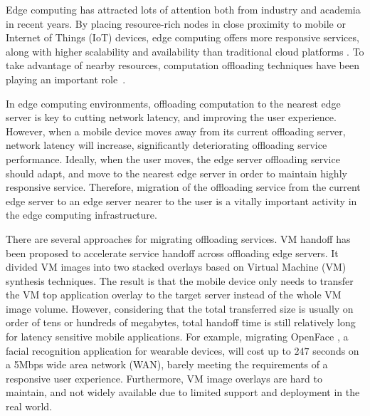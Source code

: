 
Edge computing has attracted lots of attention both from industry and academia in recent years\cite{satya2009case,  MEC2014initiative, MEC2015-5G, yi2015fog,yi2015survey,shi2016edge,chiang2016fog,satya2017edge}.
By placing resource-rich nodes in close proximity to mobile or Internet of Things (IoT) devices, edge computing offers more responsive services, along with higher scalability and availability than traditional cloud platforms \cite{MEC2014initiative,satya2017edge}.
To take advantage of nearby resources, computation offloading techniques have been playing an important role~\cite{cuervo2010maui,lane2016deepx,openface2016,liu2016paradrop}.

In edge computing environments, offloading computation to the nearest edge server is key to cutting network latency, and improving the user experience. 
However, when a mobile device moves away from its current offloading server, network latency will increase, significantly deteriorating offloading service performance. Ideally, when the user moves, the edge server offloading service should adapt, and move to the nearest edge server in order to maintain highly responsive service. 
Therefore, migration of the offloading service from the current edge server to an edge server nearer to the user is a vitally important activity in the edge computing infrastructure. 

There are several approaches for migrating offloading services. 
VM handoff \cite{ha2015vmhandoff} has been proposed to accelerate service handoff across offloading edge servers. It divided VM images into two stacked overlays based on Virtual Machine (VM) synthesis \cite{satya2009case} techniques. 
The result is that the mobile device only needs to transfer the VM top application overlay to the target server instead of the whole VM image volume. However, considering that the total transferred size is usually on order of tens or hundreds of megabytes, total handoff time is still relatively long for latency sensitive mobile applications. For example, migrating OpenFace \cite{openface2016}, a facial recognition application for wearable devices, will cost up to $247$ seconds on a 5Mbps wide area network (WAN), barely meeting the requirements of a responsive user experience. 
Furthermore, VM image overlays are hard to maintain, and not widely available due to limited support and deployment in the real world.

